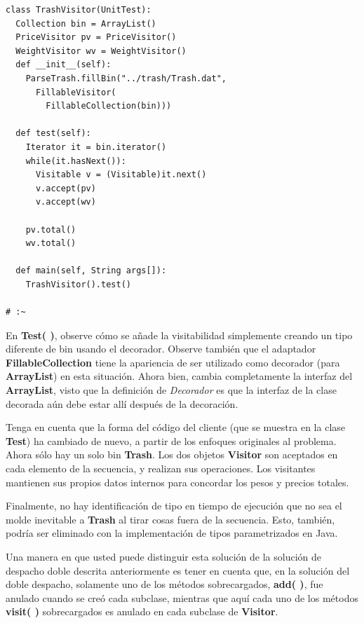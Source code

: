 \documentclass{article}
\begin{document}
\begin{lstlisting}
class TrashVisitor(UnitTest): 
  Collection bin = ArrayList() 
  PriceVisitor pv = PriceVisitor() 
  WeightVisitor wv = WeightVisitor() 
  def __init__(self): 
    ParseTrash.fillBin("../trash/Trash.dat",  
      FillableVisitor( 
        FillableCollection(bin))) 
        
  def test(self): 
    Iterator it = bin.iterator() 
    while(it.hasNext()): 
      Visitable v = (Visitable)it.next() 
      v.accept(pv) 
      v.accept(wv) 
      
    pv.total() 
    wv.total() 
    
  def main(self, String args[]): 
    TrashVisitor().test() 
    
# :~ 
\end{lstlisting}

En \textbf{Test( )}, observe cómo se añade la visitabilidad simplemente creando un tipo diferente de bin usando el decorador. Observe también que el adaptador \textbf{FillableCollection} tiene la apariencia de ser utilizado como decorador (para \textbf{ArrayList}) en esta situación.  Ahora bien, cambia completamente la interfaz del \textbf{ArrayList}, visto que la definición de \textit{Decorador} es que la interfaz de la clase decorada aún debe estar allí después de la decoración.      \newline

Tenga en cuenta que la forma del código del cliente (que se muestra en la clase \textbf{Test}) ha cambiado de nuevo, a partir de los enfoques originales al problema. Ahora sólo hay un solo bin \textbf{Trash}. Los dos objetos \textbf{Visitor} son aceptados en cada elemento de la secuencia, y realizan sus operaciones. Los visitantes mantienen sus propios datos internos para concordar los pesos y precios totales.        \newline

Finalmente, no hay identificación de tipo en tiempo de ejecución que no sea el molde inevitable a \textbf{Trash} al tirar cosas fuera de la secuencia. Esto, también, podría ser eliminado con la implementación de tipos parametrizados en Java.        \newline

Una manera en que usted puede distinguir esta solución de la solución de despacho doble descrita anteriormente es tener en cuenta que, en la solución del doble despacho, solamente uno de los métodos sobrecargados, \textbf{add( )},  fue anulado cuando se creó cada subclase, mientras que aquí cada uno de los métodos \textbf{visit( )} sobrecargados es anulado en cada subclase de \textbf{Visitor}.          \newline
\end{document}
